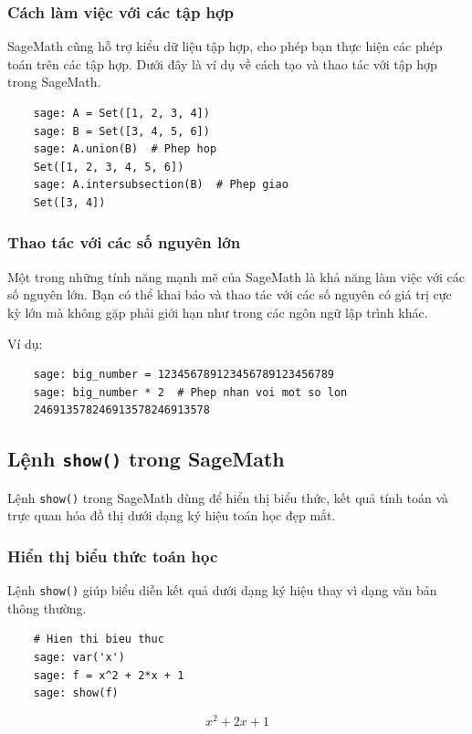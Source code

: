 \subsubsection{Cách làm việc với các tập hợp}

SageMath cũng hỗ trợ kiểu dữ liệu tập hợp, cho phép bạn thực hiện các phép toán trên các tập hợp. Dưới đây là ví dụ về cách tạo và thao tác với tập hợp trong SageMath.

\begin{lstlisting}
	sage: A = Set([1, 2, 3, 4])
	sage: B = Set([3, 4, 5, 6])
	sage: A.union(B)  # Phep hop
	Set([1, 2, 3, 4, 5, 6])
	sage: A.intersubsection(B)  # Phep giao
	Set([3, 4])
\end{lstlisting}

\subsubsection{Thao tác với các số nguyên lớn}

Một trong những tính năng mạnh mẽ của SageMath là khả năng làm việc với các số nguyên lớn. Bạn có thể khai báo và thao tác với các số nguyên có giá trị cực kỳ lớn mà không gặp phải giới hạn như trong các ngôn ngữ lập trình khác.

Ví dụ:

\begin{lstlisting}
	sage: big_number = 123456789123456789123456789
	sage: big_number * 2  # Phep nhan voi mot so lon
	246913578246913578246913578
\end{lstlisting}

\subsection{Lệnh \texttt{show()} trong SageMath}

Lệnh \texttt{show()} trong SageMath dùng để hiển thị biểu thức, kết quả tính toán và trực quan hóa đồ thị dưới dạng ký hiệu toán học đẹp mắt.

\subsubsection{Hiển thị biểu thức toán học}

Lệnh \texttt{show()} giúp biểu diễn kết quả dưới dạng ký hiệu thay vì dạng văn bản thông thường.

\begin{lstlisting}
	# Hien thi bieu thuc
	sage: var('x')
	sage: f = x^2 + 2*x + 1
	sage: show(f)
\end{lstlisting}
	$$x^2 + 2x + 1$$

